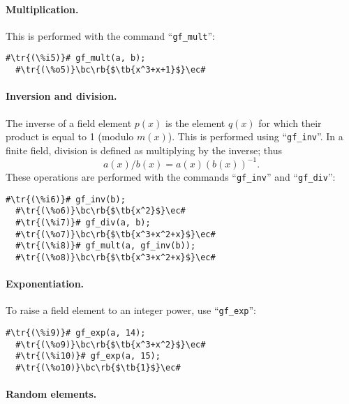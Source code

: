 \documentclass[a4paper,11pt,leqno,fleqn]{artikel3}
\newcommand{\bc}{\begin{center}}
\newcommand{\ec}{\end{center}}
\newcommand{\tr}[1]{\textcolor{red}{#1}}
\newcommand{\tb}[1]{\textcolor{blue}{#1}}
\newcommand{\rb}[1]{\raisebox{2mm}[0mm][1mm]{#1}}
\begin{document}
\paragraph{Multiplication.}

This is performed with the command ``\verb!gf_mult!'':

\vspace*{2mm}
\begin{lstlisting}[escapechar=\#]
  #\tr{(\%i5)}# gf_mult(a, b);
  #\tr{(\%o5)}\bc\rb{$\tb{x^3+x+1}$}\ec#
\end{lstlisting}


\paragraph{Inversion and division.}

The inverse of a field element $p(x)$ is the element $q(x)$ for which their
product is equal to 1 (modulo $m(x)$).  This is performed using
``\verb!gf_inv!''.  In a finite field, division is defined as multiplying by
the inverse; thus
\[
a(x)/b(x)=a(x)(b(x))^{-1}.
\]
These operations are performed with the commands ``\verb!gf_inv!'' and
``\verb!gf_div!'':

\vspace*{2mm}
\begin{lstlisting}[escapechar=\#]
  #\tr{(\%i6)}# gf_inv(b);
  #\tr{(\%o6)}\bc\rb{$\tb{x^2}$}\ec#
  #\tr{(\%i7)}# gf_div(a, b);
  #\tr{(\%o7)}\bc\rb{$\tb{x^3+x^2+x}$}\ec#
  #\tr{(\%i8)}# gf_mult(a, gf_inv(b));
  #\tr{(\%o8)}\bc\rb{$\tb{x^3+x^2+x}$}\ec#
\end{lstlisting}


\paragraph{Exponentiation.}

To raise a field element to an integer power, use ``\verb!gf_exp!'':

\vspace*{2mm}
\begin{lstlisting}[escapechar=\#]
  #\tr{(\%i9)}# gf_exp(a, 14);
  #\tr{(\%o9)}\bc\rb{$\tb{x^3+x^2}$}\ec#
  #\tr{(\%i10)}# gf_exp(a, 15);
  #\tr{(\%o10)}\bc\rb{$\tb{1}$}\ec#
\end{lstlisting}


\paragraph{Random elements.}
\end{document}
